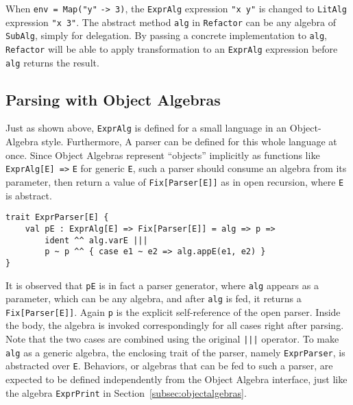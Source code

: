 When \lstinline{env = Map("y"} \lstinline{-> 3)}, the \lstinline{ExprAlg} expression \lstinline{"x y"} is changed to \lstinline{LitAlg} expression \lstinline{"x 3"}. The abstract method
\lstinline{alg} in \lstinline{Refactor} can be any algebra of \lstinline{SubAlg}, simply for delegation. By passing a concrete implementation
to \lstinline{alg}, \lstinline{Refactor} will be able to apply transformation to an \lstinline{ExprAlg} expression before \lstinline{alg} returns the result.

\subsection{Parsing with Object Algebras}\label{subsec:parsingwithoa}

Just as shown above, \lstinline{ExprAlg} is defined for a small language in an Object-Algebra style. Furthermore,
A parser can be defined for this whole language at once. Since Object Algebras represent ``objects'' implicitly as functions like \lstinline{ExprAlg[E] =>} \lstinline{E} for generic \lstinline{E}, such a parser should consume an algebra from its parameter, then return a value of \lstinline{Fix[Parser[E]]} as in open recursion, where \lstinline{E} is abstract.
\begin{lstlisting}
trait ExprParser[E] {
    val pE : ExprAlg[E] => Fix[Parser[E]] = alg => p =>
        ident ^^ alg.varE |||
        p ~ p ^^ { case e1 ~ e2 => alg.appE(e1, e2) }
}
\end{lstlisting}
It is observed that \lstinline{pE} is in fact a parser generator, where \lstinline{alg} appears as a parameter, which can be any algebra, and after \lstinline{alg} is fed, it returns a \lstinline{Fix[Parser[E]]}. Again \lstinline{p} is the explicit self-reference of the open parser. Inside the body, the algebra is invoked correspondingly for all cases right after parsing. Note that the two cases are combined using the original \lstinline{|||} operator. To make \lstinline{alg} as a generic algebra, the enclosing trait of the parser, namely \lstinline{ExprParser}, is abstracted over \lstinline{E}. Behaviors, or algebras that can be fed to such a parser, are expected to be defined independently from the Object Algebra interface, just like the algebra \lstinline{ExprPrint} in Section~\ref{subsec:objectalgebras}.

